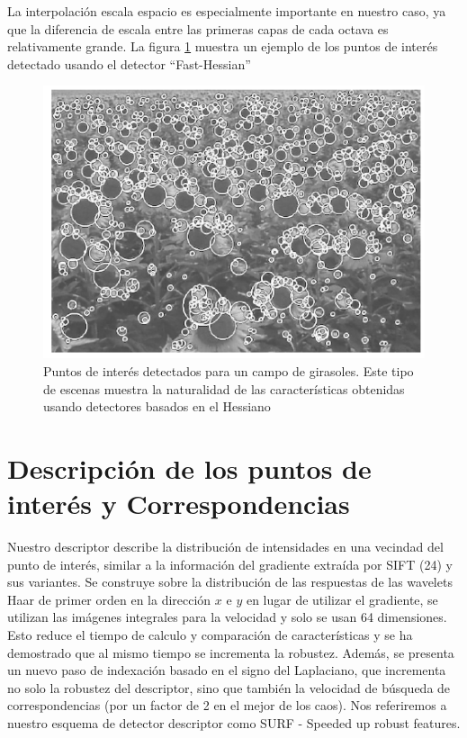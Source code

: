 La interpolación escala espacio es especialmente importante en nuestro caso, ya que la diferencia de escala entre las primeras capas de cada octava es relativamente grande. La figura \ref{fig:pointsdetectedexampleimage} muestra un ejemplo de los puntos de interés detectado usando el detector ``Fast-Hessian''

\begin{figure}[tbhp]
   \centering
        \includegraphics[scale=0.4]{./figs/pointsdetectedexampleimage}
    \caption[]{Puntos de interés detectados para un campo de girasoles. Este tipo de escenas muestra la naturalidad de las características obtenidas usando detectores basados en el Hessiano}
   \label{fig:pointsdetectedexampleimage}                %
\end{figure}

\section{Descripción de los puntos de interés y Correspondencias}
Nuestro descriptor describe la distribución de intensidades en una vecindad del punto de interés, similar a la información del gradiente extraída por SIFT (24) y sus variantes. Se construye sobre la distribución de las respuestas de las wavelets Haar de primer orden en la dirección $x$ e $y$ en lugar de utilizar el gradiente, se utilizan las imágenes integrales para la velocidad y solo se usan 64 dimensiones. Esto reduce el tiempo de calculo y comparación de características y se ha demostrado que al mismo tiempo se incrementa la robustez. Además, se presenta un nuevo paso de indexación basado en el signo del Laplaciano, que incrementa no solo la robustez del descriptor, sino que también la velocidad de búsqueda de correspondencias (por un factor de 2 en el mejor de los caos). Nos referiremos a nuestro esquema de detector descriptor como SURF - Speeded up robust features.

